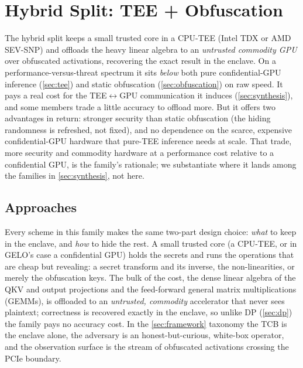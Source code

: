 \section{Hybrid Split: TEE + Obfuscation}
\label{sec:hybrid}


The hybrid split keeps a small trusted core in a CPU-TEE (Intel TDX or AMD SEV-SNP) and
offloads the heavy linear algebra to an \emph{untrusted commodity GPU} over obfuscated
activations, recovering the exact result in the enclave. On a performance-versus-threat
spectrum it sits \emph{below} both pure confidential-GPU inference (\cref{sec:tee}) and
static obfuscation (\cref{sec:obfuscation}) on raw speed. It pays a real cost for the
TEE$\leftrightarrow$GPU communication it induces (\cref{sec:synthesis}), and some members
trade a little accuracy to offload more. But it offers two advantages in return: stronger
security than static obfuscation (the hiding randomness is refreshed, not fixed), and no
dependence on the scarce, expensive confidential-GPU hardware that pure-TEE inference
needs at scale. That trade, more security and commodity hardware at a performance cost
relative to a confidential GPU, is the family's rationale; we substantiate where it
lands among the families in \cref{sec:synthesis}, not here.

\subsection{Approaches}
Every scheme in this family makes the same two-part design choice: \emph{what} to keep in
the enclave, and \emph{how} to hide the rest. A small trusted core (a CPU-TEE, or in
GELO's case a confidential GPU) holds the secrets and runs the operations that are cheap
but revealing: a secret transform and its inverse, the non-linearities, or merely the
obfuscation keys. The bulk of the cost, the dense linear algebra of the QKV and output
projections and the feed-forward general matrix multiplications (GEMMs), is offloaded to an \emph{untrusted, commodity}
accelerator that never sees plaintext; correctness is recovered exactly in the enclave, so
unlike DP (\cref{sec:dp}) the family pays no accuracy cost. In the \cref{sec:framework}
taxonomy the TCB is the enclave alone, the adversary is an honest-but-curious, white-box
operator, and the observation surface is the stream of obfuscated activations crossing the
PCIe boundary.

